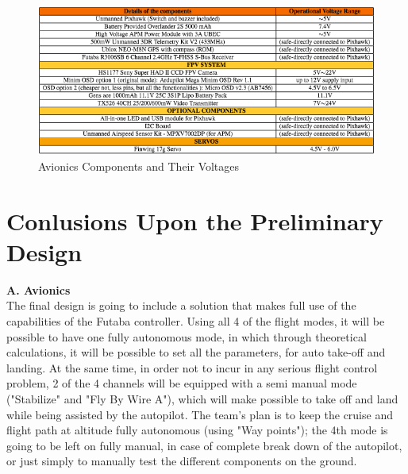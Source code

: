 \documentclass[12pt]{article}
\begin{document}
\begin{figure}[h!]
\includegraphics[width=18cm, scale=1]{Hamzatable.png}
\caption{Avionics Components and Their Voltages}
\end{figure}

\section{Conlusions Upon the Preliminary Design}

\textbf{A. Avionics}\\
\noindent The final design is going to include a solution that makes full use of the capabilities of the Futaba controller. Using all 4 of the flight modes, it will be possible to have one fully autonomous mode, in which   through theoretical calculations, it will be possible to set all the parameters, for auto take-off and landing. At the same time, in order not to incur in any serious flight control problem, 2 of the 4 channels will be equipped with a semi manual mode ("Stabilize" and "Fly By Wire A"), which will make possible to take off and land while being assisted by the autopilot. The team's plan is to keep the cruise and flight path at altitude fully autonomous (using "Way points"); the 4th mode is going to be left on fully manual, in case of complete break down of the autopilot, or just simply to manually test the different components on the ground.\\
\end{document}
